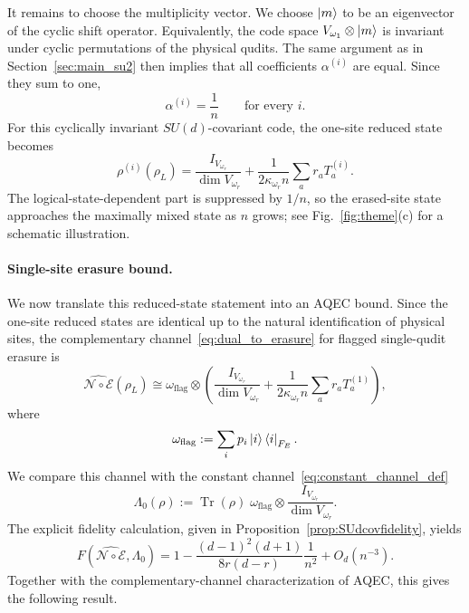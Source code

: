 \documentclass[10pt,twocolumn,superscriptaddress,aps,amsmath,amssymb,citeautoscript,floatfix,prx]{revtex4-2}
\theoremstyle{plain}
\theoremstyle{plain}
\theoremstyle{plain}
\theoremstyle{plain}
\theoremstyle{plain}
\theoremstyle{plain}
\theoremstyle{plain}
\theoremstyle{definition}
\theoremstyle{plain}
\begin{document}
It remains to choose the multiplicity vector. We choose $\ket m$ to be an eigenvector of the cyclic shift operator. 
Equivalently, the code space $V_{\omega_1}\otimes\ket m$ is invariant under cyclic permutations of the physical qudits. 
The same argument as in Section~\ref{sec:main_su2} then implies that all coefficients $\alpha^{(i)}$ are equal. Since they sum to one,
$$
\alpha^{(i)}=\frac1n
\qquad
\text{for every } i .
$$
For this cyclically invariant $SU(d)$-covariant code, the one-site reduced state becomes
$$
\rho^{(i)}(\rho_L)
=
\frac{I_{V_{\omega_r}}}{\dim V_{\omega_r}}
+
\frac{1}{2\kappa_{\omega_r}n}
\sum_a r_a T_a^{(i)} .
$$
The logical-state-dependent part is suppressed by $1/n$, so the erased-site state approaches the maximally mixed state as $n$ grows; 
see Fig.~\ref{fig:theme}(c) for a schematic illustration.

\paragraph{Single-site erasure bound.}

We now translate this reduced-state statement into an AQEC bound. Since the one-site reduced states are identical up to the natural identification of physical sites, 
the complementary channel~\eqref{eq:dual_to_erasure} for flagged single-qudit erasure is
$$
\widehat{\mathcal N\circ\mathcal E}(\rho_L)
\cong
\omega_{\mathrm{flag}}
\otimes
\left(
\frac{I_{V_{\omega_r}}}{\dim V_{\omega_r}}
+
\frac{1}{2\kappa_{\omega_r}n}
\sum_a r_a T_a^{(1)}
\right),
$$
where
$$
\omega_{\mathrm{flag}}
:=
\sum_i p_i\ket i\bra i_{F_E}.
$$
We compare this channel with the constant channel~\eqref{eq:constant_channel_def}
$$
\Lambda_0(\rho)
:=
\operatorname{Tr}(\rho)\;
\omega_{\mathrm{flag}}
\otimes
\frac{I_{V_{\omega_r}}}{\dim V_{\omega_r}} .
$$
The explicit fidelity calculation, given in Proposition~\ref{prop:SUdcovfidelity}, yields
\begin{equation}\label{eq:fidelity_sud}
F\left(\widehat{\mathcal N\circ\mathcal E},\Lambda_0\right)
=
1
-
\frac{(d-1)^2(d+1)}{8r(d-r)}
\frac{1}{n^2}
+
O_{d}(n^{-3}) .
\end{equation}
Together with the complementary-channel characterization of AQEC, this gives the following result.
\end{document}
